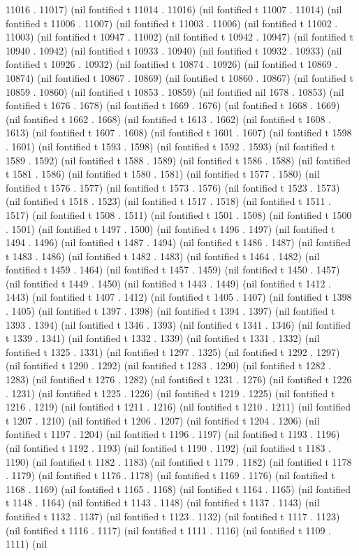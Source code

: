 {{{11016 . 11017) (nil fontified t 11014 . 11016) (nil fontified t 11007 . 11014) (nil fontified t 11006 . 11007) (nil fontified t 11003 . 11006) (nil fontified t 11002 . 11003) (nil fontified t 10947 . 11002) (nil fontified t 10942 . 10947) (nil fontified t 10940 . 10942) (nil fontified t 10933 . 10940) (nil fontified t 10932 . 10933) (nil fontified t 10926 . 10932) (nil fontified t 10874 . 10926) (nil fontified t 10869 . 10874) (nil fontified t 10867 . 10869) (nil fontified t 10860 . 10867) (nil fontified t 10859 . 10860) (nil fontified t 10853 . 10859) (nil fontified nil 1678 . 10853) (nil fontified t 1676 . 1678) (nil fontified t 1669 . 1676) (nil fontified t 1668 . 1669) (nil fontified t 1662 . 1668) (nil fontified t 1613 . 1662) (nil fontified t 1608 . 1613) (nil fontified t 1607 . 1608) (nil fontified t 1601 . 1607) (nil fontified t 1598 . 1601) (nil fontified t 1593 . 1598) (nil fontified t 1592 . 1593) (nil fontified t 1589 . 1592) (nil fontified t 1588 . 1589) (nil fontified t 1586 . 1588) (nil fontified t 1581 . 1586) (nil fontified t 1580 . 1581) (nil fontified t 1577 . 1580) (nil fontified t 1576 . 1577) (nil fontified t 1573 . 1576) (nil fontified t 1523 . 1573) (nil fontified t 1518 . 1523) (nil fontified t 1517 . 1518) (nil fontified t 1511 . 1517) (nil fontified t 1508 . 1511) (nil fontified t 1501 . 1508) (nil fontified t 1500 . 1501) (nil fontified t 1497 . 1500) (nil fontified t 1496 . 1497) (nil fontified t 1494 . 1496) (nil fontified t 1487 . 1494) (nil fontified t 1486 . 1487) (nil fontified t 1483 . 1486) (nil fontified t 1482 . 1483) (nil fontified t 1464 . 1482) (nil fontified t 1459 . 1464) (nil fontified t 1457 . 1459) (nil fontified t 1450 . 1457) (nil fontified t 1449 . 1450) (nil fontified t 1443 . 1449) (nil fontified t 1412 . 1443) (nil fontified t 1407 . 1412) (nil fontified t 1405 . 1407) (nil fontified t 1398 . 1405) (nil fontified t 1397 . 1398) (nil fontified t 1394 . 1397) (nil fontified t 1393 . 1394) (nil fontified t 1346 . 1393) (nil fontified t 1341 . 1346) (nil fontified t 1339 . 1341) (nil fontified t 1332 . 1339) (nil fontified t 1331 . 1332) (nil fontified t 1325 . 1331) (nil fontified t 1297 . 1325) (nil fontified t 1292 . 1297) (nil fontified t 1290 . 1292) (nil fontified t 1283 . 1290) (nil fontified t 1282 . 1283) (nil fontified t 1276 . 1282) (nil fontified t 1231 . 1276) (nil fontified t 1226 . 1231) (nil fontified t 1225 . 1226) (nil fontified t 1219 . 1225) (nil fontified t 1216 . 1219) (nil fontified t 1211 . 1216) (nil fontified t 1210 . 1211) (nil fontified t 1207 . 1210) (nil fontified t 1206 . 1207) (nil fontified t 1204 . 1206) (nil fontified t 1197 . 1204) (nil fontified t 1196 . 1197) (nil fontified t 1193 . 1196) (nil fontified t 1192 . 1193) (nil fontified t 1190 . 1192) (nil fontified t 1183 . 1190) (nil fontified t 1182 . 1183) (nil fontified t 1179 . 1182) (nil fontified t 1178 . 1179) (nil fontified t 1176 . 1178) (nil fontified t 1169 . 1176) (nil fontified t 1168 . 1169) (nil fontified t 1165 . 1168) (nil fontified t 1164 . 1165) (nil fontified t 1148 . 1164) (nil fontified t 1143 . 1148) (nil fontified t 1137 . 1143) (nil fontified t 1132 . 1137) (nil fontified t 1123 . 1132) (nil fontified t 1117 . 1123) (nil fontified t 1116 . 1117) (nil fontified t 1111 . 1116) (nil fontified t 1109 . 1111) (nil }}}
